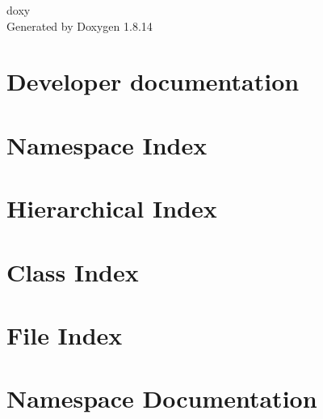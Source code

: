 \documentclass[twoside]{book}
\newcommand{\+}{\discretionary{\mbox{\scriptsize$\hookleftarrow$}}{}{}}
\newcommand{\clearemptydoublepage}{%
  \newpage{\pagestyle{empty}\cleardoublepage}%
}
\begin{document}
\hypersetup{pageanchor=false,
             bookmarksnumbered=true,
             pdfencoding=unicode
            }
\begin{titlepage}
\vspace*{7cm}
\begin{center}%
{\Large doxy }\\
\vspace*{1cm}
{\large Generated by Doxygen 1.8.14}\\
\end{center}
\end{titlepage}
\clearemptydoublepage
{}
\tableofcontents
\clearemptydoublepage
{}
\hypersetup{pageanchor=true}

\chapter{Developer documentation}
\label{index}\hypertarget{index}{}
\chapter{Namespace Index}

\chapter{Hierarchical Index}

\chapter{Class Index}

\chapter{File Index}

\chapter{Namespace Documentation}









\end{document}
